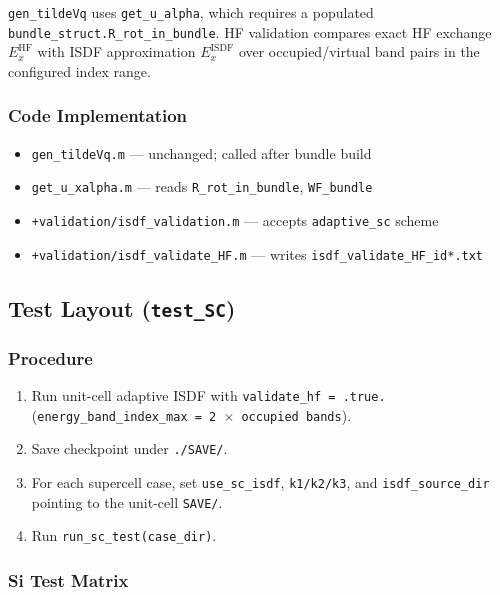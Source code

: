 \documentclass[11pt,a4paper]{article}
\begin{document}
\texttt{gen\_tildeVq} uses \texttt{get\_u\_alpha}, which requires a populated
\texttt{bundle\_struct.R\_rot\_in\_bundle}.
HF validation compares exact HF exchange $E_x^{\mathrm{HF}}$ with ISDF
approximation $E_x^{\mathrm{ISDF}}$ over occupied/virtual band pairs in the
configured index range.

\subsubsection{Code Implementation}

\begin{itemize}
  \item \texttt{gen\_tildeVq.m} --- unchanged; called after bundle build
  \item \texttt{get\_u\_xalpha.m} --- reads \texttt{R\_rot\_in\_bundle}, \texttt{WF\_bundle}
  \item \texttt{+validation/isdf\_validation.m} --- accepts \texttt{adaptive\_sc} scheme
  \item \texttt{+validation/isdf\_validate\_HF.m} --- writes \texttt{isdf\_validate\_HF\_id*.txt}
\end{itemize}

\subsection{Test Layout (\texttt{test\_SC})}

\subsubsection{Procedure}

\begin{enumerate}
  \item Run unit-cell adaptive ISDF with \texttt{validate\_hf = .true.}
        (\texttt{energy\_band\_index\_max = 2 $\times$ occupied bands}).
  \item Save checkpoint under \texttt{./SAVE/}.
  \item For each supercell case, set \texttt{use\_sc\_isdf}, \texttt{k1/k2/k3},
        and \texttt{isdf\_source\_dir} pointing to the unit-cell \texttt{SAVE/}.
  \item Run \texttt{run\_sc\_test(case\_dir)}.
\end{enumerate}

\subsubsection{Si Test Matrix}
\end{document}
